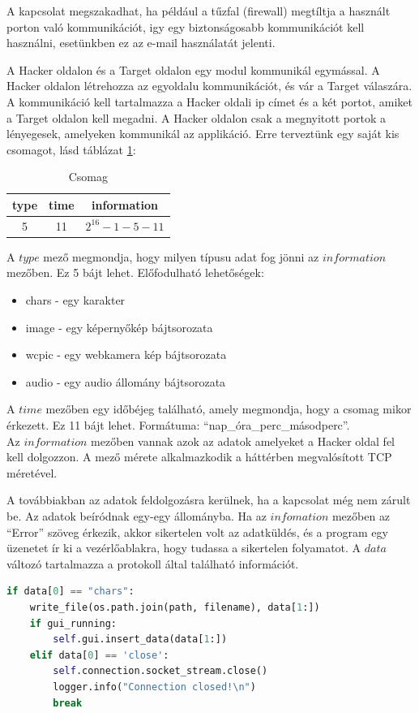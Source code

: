 \documentclass[12pt,a4paper,oneside]{report}
\begin{document}
A kapcsolat megszakadhat, ha például a tűzfal (firewall) megtíltja a használt porton való kommunikációt, igy egy biztonságosabb kommunikációt kell használni, esetünkben ez az e-mail használatát jelenti.

A Hacker oldalon és a Target oldalon egy modul kommunikál egymással. A Hacker oldalon létrehozza az egyoldalu kommunikációt, és vár a Target válaszára. A kommunikáció kell tartalmazza a Hacker oldali ip címet és a két portot, amiket a Target oldalon kell megadni. A Hacker oldalon csak a megnyitott portok a lényegesek, amelyeken kommunikál az applikáció. Erre terveztünk egy saját kis csomagot, lásd táblázat \ref{tab:protocol}:
\begin{table}[H]
\centering
\caption{Csomag}
\label{tab:protocol}
\begin{tabular}{|c|c|c|}
\hline
\textbf{type} & \textbf{time} & \textbf{information} \\
\hline
5 & 11 & $2^{16}-1-5-11$ \\
\hline
\end{tabular}
\end{table}
A $type$ mező megmondja, hogy milyen típusu adat fog jönni az $information$ mezőben. Ez 5 bájt lehet. Előfodulható lehetőségek:
\begin{itemize}
\item chars - egy karakter
\item image - egy képernyőkép bájtsorozata
\item wcpic - egy webkamera kép bájtsorozata
\item audio - egy audio állomány bájtsorozata
\end{itemize}
A $time$ mezőben egy időbéjeg található, amely megmondja, hogy a csomag mikor érkezett. Ez 11 bájt lehet. Formátuma: ``nap\_óra\_perc\_másodperc''.\\
Az $information$ mezőben vannak azok az adatok amelyeket a Hacker oldal fel kell dolgozzon. A mező mérete alkalmazkodik a háttérben megvalósított TCP méretével.

A továbbiakban az adatok feldolgozásra kerülnek, ha a kapcsolat még nem zárult be. Az adatok beíródnak egy-egy állományba. Ha az $infomation$ mezőben az ``Error'' szöveg érkezik, akkor sikertelen volt az adatküldés, és a program egy üzenetet ír ki a vezérlőablakra, hogy tudassa a sikertelen folyamatot. A $data$ változó tartalmazza a protokoll által található információt.
\begin{lstlisting}[language=Python]
if data[0] == "chars":
	write_file(os.path.join(path, filename), data[1:])
	if gui_running:
		self.gui.insert_data(data[1:])
	elif data[0] == 'close':
		self.connection.socket_stream.close()
		logger.info("Connection closed!\n")
		break
\end{lstlisting}
\end{document}
